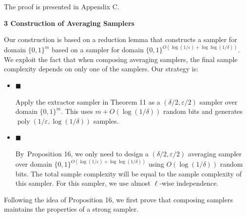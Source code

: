 \documentclass[10pt,a4paper]{article}
\begin{document}



The proof is presented in Appendix C.\par






\par\medskip\noindent\textbf{
3 Construction of Averaging Samplers}\par




Our construction is based on a reduction lemma that constructs a sampler for domain $\{0,1\}^{m}$ based on a sampler for domain $\{0,1\}^{O(\log(1/\varepsilon)+\log\log(1/\delta))}$.
We exploit the fact that when composing averaging samplers, the final sample complexity depends on only one of the samplers. Our strategy is:\par


\begin{itemize}


\item[] 
$\blacksquare$ 


Apply the extractor sampler in Theorem 11 as a $(\delta/2,\varepsilon/2)$ sampler over domain $\{0,1\}^{m}$. This uses $m+O(\log(1/\delta))$ random bits and generates $\operatorname*{poly}(1/\varepsilon,\log(1/\delta))$ samples.\par





\item[] 
$\blacksquare$ 


By Proposition 16, we only need to design a $(\delta/2,\varepsilon/2)$ averaging sampler over domain $\{0,1\}^{O(\log(1/\varepsilon)+\log\log(1/\delta))}$ using $O(\log(1/\delta))$ random bits. The total sample complexity will be equal to the sample complexity of this sampler. For this sampler, we use almost $\ell$-wise independence.\par





\end{itemize}




Following the idea of Proposition 16,
we first prove that composing samplers maintains the properties of a strong sampler.\par



\end{document}
